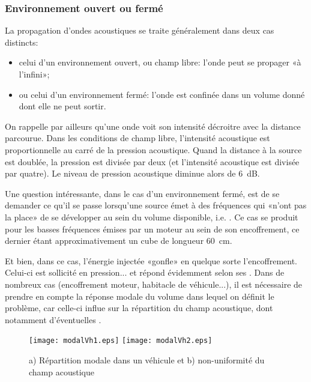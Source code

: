 \medskip
\subsubsection{Environnement ouvert ou fermé}

La propagation d'ondes acoustiques se traite généralement dans deux cas distincts:
\begin{itemize}
   \item celui d'un environnement ouvert, ou champ libre: l'onde peut se propager «à l'infini»;
   \item ou celui d'un environnement fermé: l'onde est confinée dans un volume donné dont elle ne peut sortir.
\end{itemize}

On rappelle par ailleurs qu'une onde voit son intensité décroitre avec la distance parcourue.
Dans les conditions de champ libre, l'intensité acoustique est proportionnelle au carré de la pression acoustique. Quand la distance à la source est doublée, la pression est divisée par deux (et l'intensité acoustique est divisée par quatre). Le niveau de pression acoustique diminue alors de 6~dB.

\medskip
Une question intéressante, dans le cas d'un environnement fermé, est de se demander ce qu'il se passe lorsqu'une source émet à des fréquences qui «n'ont pas la place» de se développer au sein du volume disponible, i.e. . Ce cas se produit pour les basses fréquences émises par un moteur au sein de son encoffrement, ce dernier étant approximativement un cube de longueur 60~cm.

Et bien, dans ce cas, l'énergie injectée «gonfle» en quelque sorte l'encoffrement. Celui-ci est sollicité en pression... et répond évidemment selon ses .
Dans de nombreux cas (encoffrement moteur, habitacle de véhicule...), il est nécessaire de prendre en compte la réponse modale du volume dans lequel on définit le problème, car celle-ci influe sur la répartition du champ acoustique, dont notamment d'éventuelles .
\begin{figure}[h!]
\centering
\texttt{[image: modalVh1.eps]}\hspace{10mm}%
\texttt{[image: modalVh2.eps]}
\caption{a) Répartition modale dans un véhicule et b) non-uniformité du champ acoustique}\label{Fig-modalVh}
\end{figure}

